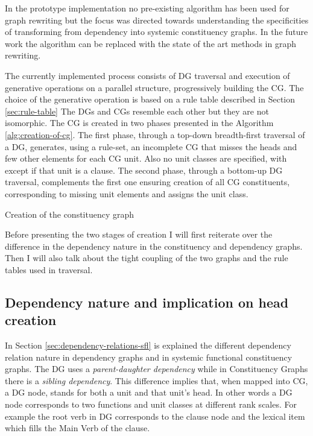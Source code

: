 In the prototype implementation no pre-existing algorithm has been used for graph rewriting but the focus was directed towards understanding the specificities of transforming from dependency into systemic constituency graphs. In the future work the algorithm can be replaced with the state of the art methods in graph rewriting. 
 
The currently implemented process consists of DG traversal and execution of generative operations on a parallel structure, progressively building the CG. The choice of the generative operation is based on a rule table described in Section \ref{sec:rule-table} The DGs and CGs resemble each other but they are not isomorphic. The CG is created in two phases presented in the Algorithm \ref{alg:creation-of-cg}. The first phase, through a top-down breadth-first traversal of a DG, generates, using a rule-set, an incomplete CG that misses the heads and few other elements for each CG unit. Also no unit classes are specified, with except if that unit is a clause. The second phase, through a bottom-up DG traversal, complements the first one ensuring creation of all CG constituents, corresponding to missing unit elements and assigns the unit class. 

\begin{algorithm}[!ht]
	\caption{Creation of the constituency graph}
	\label{alg:creation-of-cg}
\end{algorithm}

Before presenting the two stages of creation I will first reiterate over the difference in the dependency nature in the constituency and dependency graphs. Then I will also talk about the tight coupling of the two graphs and the rule tables used in traversal. 

\subsection{Dependency nature and implication on head creation}
\label{sec:dep-implications}
In Section \ref{sec:dependency-relations-sfl} is explained the different dependency relation nature in dependency graphs and in systemic functional constituency graphs. The DG uses a \textit{parent-daughter dependency} while in Constituency Graphs there is a \textit{sibling dependency}. This difference implies that, when mapped into CG, a DG node, stands for both a unit and that unit's head. In other words a DG node corresponds to two functions and unit classes at different rank scales. For example the root verb in DG corresponds to the clause node and the lexical item which fills the Main Verb of the clause. 

